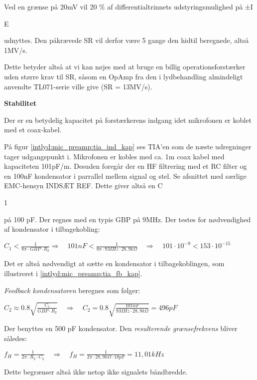 Ved en grænse på 20mV vil 20 \% af differentialtrinnets udstyringsmulighed på ±I\begin{tiny}E\end{tiny} udnyttes. Den påkrævede SR vil derfor være 5 gange den hidtil beregnede, altså 1MV/s.

Dette betyder altså at vi kan nøjes med at bruge en billig operationsforstærker uden større krav til SR, såsom en OpAmp fra den i lydbehandling almindeligt anvendte TL071-serie ville give (SR = 13MV/s).

\textbf{Stabilitet}

Der er en betydelig kapacitet på forstærkerens indgang idet mikrofonen er koblet med et coax-kabel.


På figur \ref{intlyd:mic_preamp:tia_ind_kap} ses TIA'en som de næste udregninger tager udgangspunkt i. Mikrofonen er kobles med ca. 1m coax kabel med kapaciteten 101pF/m. Desuden foregår der en HF filtrering med et RC filter og en 100nF kondensator i parrallel mellem signal og stel. Se afsnittet med særlige EMC-hensyn INDSÆT REF. Dette giver altså en C\begin{tiny}1\end{tiny} på 100 pF.
Der regnes med en typis GBP på 9MHz. Der testes for nødvendighed af kondensator i tilbagekobling:
\begin{center}
${ C }_{ 1 }<\frac { 1 }{ 8\pi \cdot GBP\cdot { R }_{ 2 } } \Longrightarrow \quad 101nF<\frac { 1 }{ 8\pi \cdot 9MHz\cdot 28,9k\Omega  } \quad \Longrightarrow \quad 101\cdot { 10 }^{ -9 }<153\cdot { 10 }^{ -15 }$
\end{center}
Det er altså nødvendigt at sætte en kondensator i tilbagekoblingen, som illustreret i \ref{intlyd:mic_preamp:tia_fb_kap}.


\textit{Feedback kondensatoren} beregnes som følger:
\begin{center}
${ C }_{ 2 }\approx 0.8\sqrt { \frac { { C }_{ 1 } }{ GBP\cdot { R }_{ 2 } }  } \quad \Longrightarrow \quad { C }_{ 2 }=0.8\sqrt { \frac { 101nF }{ 9MHz\cdot 28,9k\Omega  }  } =496pF\quad$
\end{center}

Der benyttes en 500 pF kondensator. Den \textit{resulterende grænsefrekvens} bliver således:
\begin{center}
${ f }_{ H }=\frac { 1 }{ 2\pi \cdot { R }_{ 2 }\cdot { C }_{ 2 } } \quad \Longrightarrow \quad { f }_{ H }=\frac { 1 }{ 2\pi \cdot 28,9k\Omega \cdot 18pF } =11,01kHz$
\end{center}

Dette begrænser altså ikke netop ikke signalets båndbredde.



